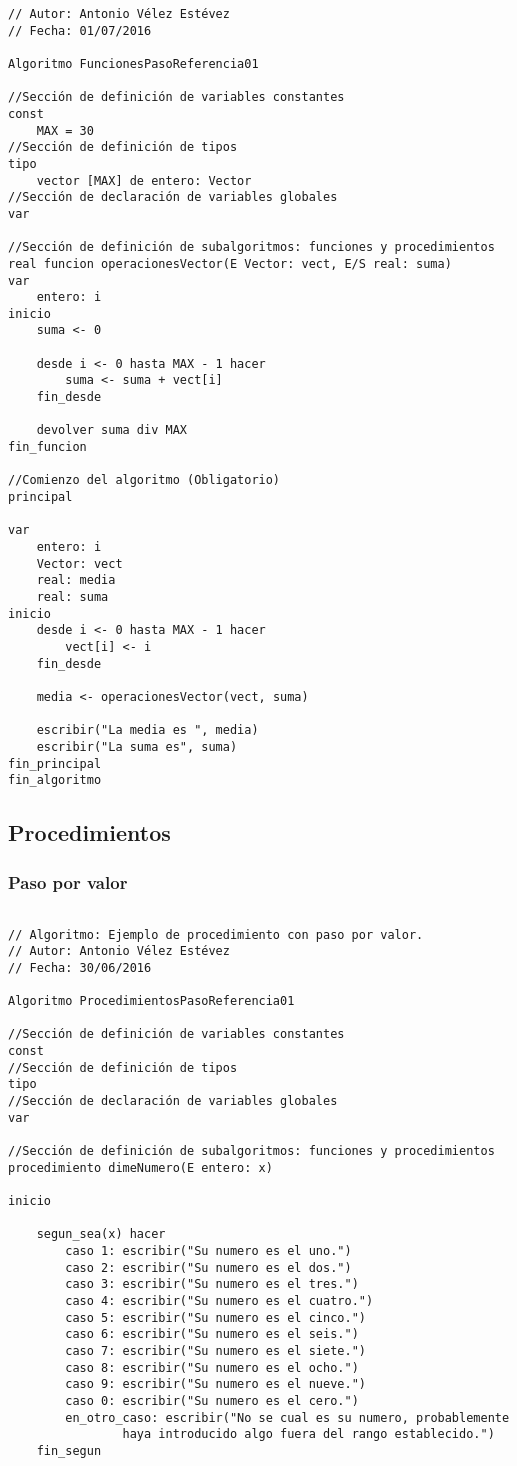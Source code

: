 \documentclass{article}
\begin{document}
\begin{appendices}
\begin{lstlisting}[language = pseudocodigoesp]
// Autor: Antonio Vélez Estévez
// Fecha: 01/07/2016
 
Algoritmo FuncionesPasoReferencia01

//Sección de definición de variables constantes
const 
	MAX = 30
//Sección de definición de tipos
tipo
	vector [MAX] de entero: Vector
//Sección de declaración de variables globales	
var

//Sección de definición de subalgoritmos: funciones y procedimientos	
real funcion operacionesVector(E Vector: vect, E/S real: suma)
var
	entero: i
inicio
	suma <- 0

	desde i <- 0 hasta MAX - 1 hacer
		suma <- suma + vect[i]
	fin_desde
	
	devolver suma div MAX
fin_funcion

//Comienzo del algoritmo (Obligatorio)
principal	

var
	entero: i
	Vector: vect
	real: media
	real: suma
inicio 	
	desde i <- 0 hasta MAX - 1 hacer
		vect[i] <- i
	fin_desde
	
	media <- operacionesVector(vect, suma)
	
	escribir("La media es ", media)
	escribir("La suma es", suma)
fin_principal
fin_algoritmo
\end{lstlisting}
\subsection{Procedimientos}
\subsubsection{Paso por valor}
\begin{lstlisting}[language = pseudocodigoesp]
  
// Algoritmo: Ejemplo de procedimiento con paso por valor.
// Autor: Antonio Vélez Estévez
// Fecha: 30/06/2016
 
Algoritmo ProcedimientosPasoReferencia01

//Sección de definición de variables constantes
const 
//Sección de definición de tipos
tipo
//Sección de declaración de variables globales	
var

//Sección de definición de subalgoritmos: funciones y procedimientos	
procedimiento dimeNumero(E entero: x)

inicio 

	segun_sea(x) hacer
		caso 1: escribir("Su numero es el uno.")
		caso 2: escribir("Su numero es el dos.")
		caso 3: escribir("Su numero es el tres.")
		caso 4: escribir("Su numero es el cuatro.")
		caso 5: escribir("Su numero es el cinco.")
		caso 6: escribir("Su numero es el seis.")
		caso 7: escribir("Su numero es el siete.")
		caso 8: escribir("Su numero es el ocho.")
		caso 9: escribir("Su numero es el nueve.")
		caso 0: escribir("Su numero es el cero.")
		en_otro_caso: escribir("No se cual es su numero, probablemente
                haya introducido algo fuera del rango establecido.")
	fin_segun


\end{lstlisting}
\end{appendices}
\end{document}
